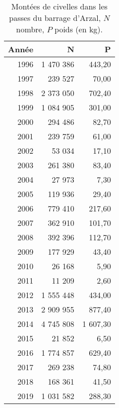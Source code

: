 \begin{table}[htbp]
\centering
\begin{tabular}{rrr}
  \hline
Année & N & P \\ 
  \hline
1996 & 1 470 386 & 443,20 \\ 
  1997 & 239 527 & 70,00 \\ 
  1998 & 2 373 050 & 702,40 \\ 
  1999 & 1 084 905 & 301,00 \\ 
  2000 & 294 486 & 82,70 \\ 
  2001 & 239 759 & 61,00 \\ 
  2002 & 53 034 & 17,10 \\ 
  2003 & 261 380 & 83,40 \\ 
  2004 & 27 973 & 7,30 \\ 
  2005 & 119 936 & 29,40 \\ 
  2006 & 779 410 & 217,60 \\ 
  2007 & 362 910 & 101,70 \\ 
  2008 & 392 396 & 112,70 \\ 
  2009 & 177 929 & 43,40 \\ 
  2010 & 26 168 & 5,90 \\ 
  2011 & 11 209 & 2,60 \\ 
  2012 & 1 555 448 & 434,00 \\ 
  2013 & 2 909 955 & 877,40 \\ 
  2014 & 4 745 808 & 1 607,30 \\ 
  2015 & 21 852 & 6,50 \\ 
  2016 & 1 774 857 & 629,40 \\ 
  2017 & 269 238 & 74,80 \\ 
  2018 & 168 361 & 41,50 \\ 
  2019 & 1 031 582 & 288,30 \\ 
   \hline
\end{tabular}
\caption{Montées de civelles dans les passes du barrage d'Arzal, $N$ nombre,
		$P$ poids (en kg).} 
\label{table_civelle}
\end{table}
